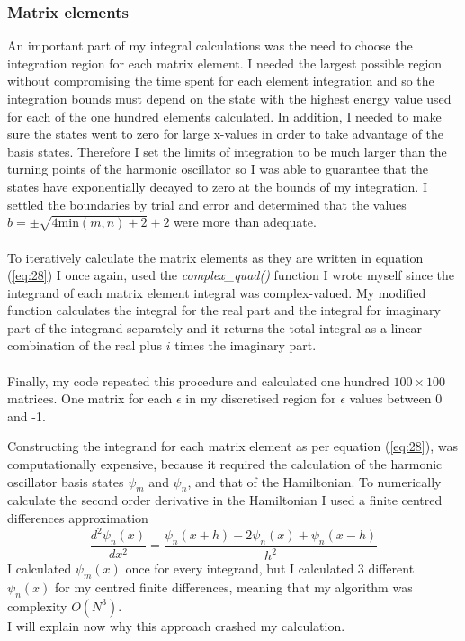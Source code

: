 \documentclass[10pt, a4paper, singlespacing, headsepline]{report}
\begin{document}
\subsubsection{Matrix elements}\label{Matrix elements}
An important part of my integral calculations was the need to choose the integration region for each matrix element. I needed the largest possible region without compromising the time spent for each element integration and so the integration bounds must depend on the state with the highest energy value used for each of the one hundred elements calculated. In addition, I needed to make sure the states went to zero for large x-values in order to take advantage of the basis states. Therefore I set the limits of integration to be much larger than the turning points of the harmonic oscillator so I was able to guarantee that the states have exponentially decayed to zero at the bounds of my integration. I settled the boundaries by trial and error and determined that the values $b  = \pm \sqrt{4 \mathrm{min}(m,n) + 2} + 2$ were more than adequate.\\\\
To iteratively calculate the matrix elements as they are written in equation (\ref{eq:28}) I once again, used the \emph{complex\_quad()} function I wrote myself since the integrand of each matrix element integral was complex-valued. My modified function calculates the integral for the real part and the integral for imaginary part of the integrand separately and it returns the total integral as a linear combination of the real plus $i$ times the imaginary part.\\
\\Finally, my code repeated this procedure and calculated one hundred $100\times100$ matrices. One matrix for each $\epsilon$ in my discretised region for $\epsilon$ values between 0 and -1.

Constructing the integrand for each matrix element as per equation (\ref{eq:28}), was computationally expensive, because it required the calculation of the harmonic oscillator basis states $\psi_m$ and $\psi_n$, and that of the Hamiltonian. To numerically calculate the second order derivative in the Hamiltonian I used a finite centred differences approximation
\begin{equation}\label{eq:29}
\frac{d^2 \psi_n(x)}{dx^2} = \frac{\psi_n(x + h) - 2 \psi_n(x) + \psi_n(x - h)}{h^2}
\end{equation}
I calculated $\psi_m(x)$ once for every integrand, but I calculated 3 different $\psi_n(x)$ for my centred finite differences, meaning that my algorithm was complexity $O(N^3)$.\\ I will explain now why this approach crashed my calculation.\\
\end{document}
